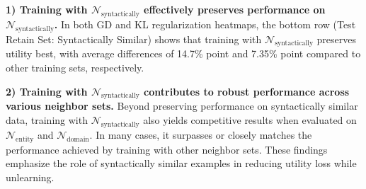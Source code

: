 \noindent
\textbf{1) Training with $\mathcal{N}_{\text{syntactically}}$ effectively preserves performance on $\mathcal{N}_{\text{syntactically}}$.} In both GD and KL regularization heatmaps, the bottom row (Test Retain Set: Syntactically Similar) shows that training with $\mathcal{N}_{\text{syntactically}}$ preserves utility best, with average differences of 14.7\% point and 7.35\% point compared to other training sets, respectively.

\noindent
\textbf{2) Training with $\mathcal{N}_{\text{syntactically}}$ contributes to robust performance across various neighbor sets.} Beyond preserving performance on syntactically similar data, training with $\mathcal{N}_{\text{syntactically}}$ also yields competitive results when evaluated on $\mathcal{N}_{\text{entity}}$ and $\mathcal{N}_{\text{domain}}$. In many cases, it surpasses or closely matches the performance achieved by training with other neighbor sets. These findings emphasize the role of syntactically similar examples in reducing utility loss while unlearning.
